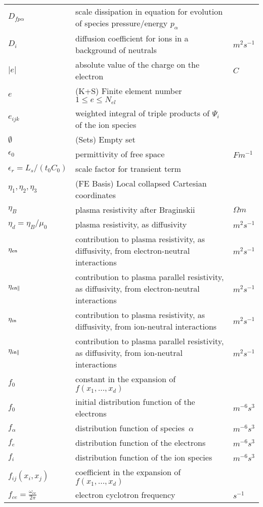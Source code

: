 \begin{longtable}{|p{3.0cm}|p{10.0cm}|p{3.0cm}|}
$D_{fp\alpha}$ & scale dissipation in  equation for evolution of species pressure/energy $p_\alpha$ & \\
$D_i$ & diffusion coefficient for ions in a background of neutrals  &  $m^2 s^{-1}$ \\
$|e|$ & absolute value of the charge on the electron & $C$ \\
$e$ &  (K+S) Finite element number $1 \leq e \leq N_{el}$ & \\
$e_{ijk}$ & weighted integral of triple products of $\Psi_i$ of the ion species & \\
$\emptyset$ &  (Sets) Empty set & \\
$\epsilon_0$ & permittivity of free space  &  $F m^{-1}$ \\
$\epsilon_r=L_s/(t_0 C_0)$ & scale factor for transient term  & \\
$\eta_1, \eta_2, \eta_3$ &  (FE Basis) Local collapsed Cartesian coordinates & \\
$\eta_B$ & plasma resistivity after Braginskii  &  $\Omega m$ \\
$\eta_d=\eta_B/\mu_0$ & plasma resistivity, as diffusivity  &  $m^2 s^{-1}$ \\
$\eta_{e{\sf n}}$ & contribution to plasma resistivity, as diffusivity, from electron-neutral interactions  &  $m^2 s^{-1}$ \\
$\eta_{e{\sf n}\|}$ & contribution to plasma parallel resistivity, as diffusivity, from electron-neutral interactions  &  $m^2 s^{-1}$ \\
$\eta_{i{\sf n}}$ & contribution to plasma resistivity, as diffusivity, from ion-neutral interactions  &  $m^2 s^{-1}$ \\
$\eta_{i{\sf n}\|}$ & contribution to plasma parallel resistivity, as diffusivity, from ion-neutral interactions  &  $m^2 s^{-1}$ \\
$f_0$ & constant in the expansion of $f\left(x_1,\ldots,x_d\right)$  & \\
$f_0$ & initial distribution function of the electrons & $m^{-6} s^3$ \\
$f_\alpha$ & distribution function of species~$\alpha$ & $m^{-6} s^3$ \\
$f_e$ & distribution function of the electrons & $m^{-6} s^3$ \\
$f_i$ & distribution function of the ion species & $m^{-6} s^3$ \\
$f_{ij}(x_i,x_j)$ & coefficient in the expansion of $f\left(x_1,\ldots,x_d\right)$  & \\
$f_{ce}= \frac{\omega_{ce}}{2\pi}$ & electron cyclotron frequency & $s^{-1}$ \\

\end{longtable}
